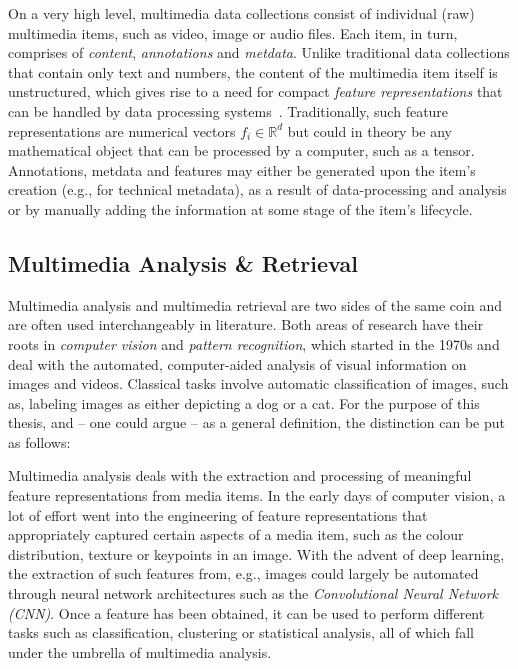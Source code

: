 On a very high level, multimedia data collections consist of individual (raw) multimedia items, such as video, image or audio files. Each item, in turn, comprises of \emph{content}, \emph{annotations} and \emph{metdata}. Unlike traditional data collections that contain only text and numbers, the content of the multimedia item itself is unstructured, which gives rise to a need for compact \emph{feature representations} that can be handled by data processing systems~\cite{Zahalka:2014towards}. Traditionally, such feature representations are numerical vectors $f_i \in \mathbb{R}^d$ but could in theory be any mathematical object that can be processed by a computer, such as a tensor. Annotations, metdata and features may either be generated upon the item's creation (e.g., for technical metadata), as a result of data-processing and analysis or by manually adding the information at some stage of the item's lifecycle. 

\subsection{Multimedia Analysis \& Retrieval}

Multimedia analysis and multimedia retrieval are two sides of the same coin and are often used interchangeably in literature. Both areas of research have their roots in \emph{computer vision} and \emph{pattern recognition}, which started in the 1970s and deal with the automated, computer-aided analysis of visual information on images and videos. Classical tasks involve automatic classification of images, such as, labeling images as either depicting a dog or a cat. For the purpose of this thesis, and -- one could argue -- as a general definition, the distinction can be put as follows:

Multimedia analysis deals with the extraction and processing of meaningful feature representations from media items. In the early days of computer vision, a lot of effort went into the engineering of feature representations that appropriately captured certain aspects of a media item, such as the colour distribution, texture or keypoints in an image. With the advent of deep learning, the extraction of such features from, e.g., images could largely be automated through neural network architectures such as the \emph{Convolutional Neural Network (CNN)}. Once a feature has been obtained, it can be used to perform different tasks such as classification, clustering or statistical analysis, all of which fall under the umbrella of multimedia analysis.

